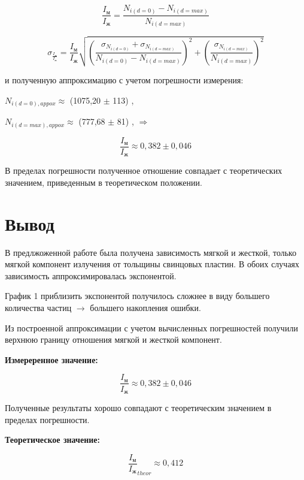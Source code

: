 \documentclass[15pt,a5paper,reqno]{article}
\begin{document}
\[ \frac{I_м}{I_ж} = \frac{N_{i(d=0)} - N_{i(d=max)}}{N_{i(d=max)}} \]

\[\sigma_{\frac{I_м}{I_ж}} = \frac{I_м}{I_ж} \sqrt{  \left(\frac{\sigma_{N_{i(d=0)}} + \sigma_{N_{i(d=max)}}}{N_{i(d=0)} - N_{i(d=max)}}\right)^{2}  + \left(\frac{\sigma_{N_{i(d=max)}}}{N_{i(d=max)}}\right)^{2}  }  \]

и полученную аппроксимацию с учетом погрешности измерения:

$N_{i(d=0), appox} \approx$ (1075,20 $\pm$ 113) ,  

$N_{i(d=max), appox} \approx$ (777,68 $\pm$ 81) ,  $\Rightarrow$

\[ \frac{I_м}{I_ж} \approx 0,382 \pm 0,046  \]

В пределах погрешности полученное отношение совпадает с теоретических значением, приведенным в теоретическом положении.

\section{Вывод}

В предлжоженной работе была получена зависимость мягкой и жесткой, только мягкой компонент излучения от тольщины свинцовых пластин. В обоих случаях зависимость аппроксимировалась экспонентой. 

График 1 приблизить экспонентой получилось сложнее в виду большего количества частиц $\rightarrow$ большего накопления ошибки.

Из построенной аппроксимации с учетом вычисленных погрешностей получили верхнюю границу отношения мягкой и жесткой компонент.

\textbf{Измереренное значение:}

\[ \frac{I_м}{I_ж} \approx 0,382 \pm 0,046 \]

Полученные результаты хорошо совпадают с теоретическим значением в пределах погрешности.

\textbf{Теоретическое значение:}

\[ {\frac{I_м}{I_ж}}_{theor} \approx 0,412 \]
\end{document}
